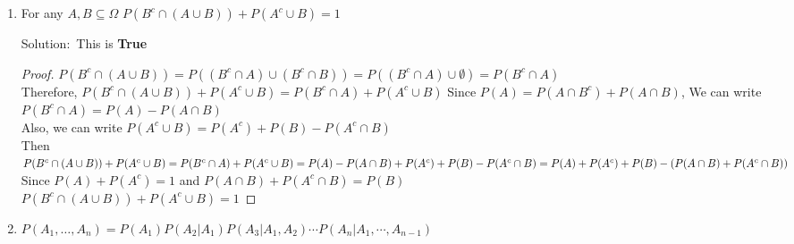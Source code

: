 \documentclass[12pt]{article}
\newcommand{\solu}{{\color{blue} Solution:}}
\begin{document}
\begin{enumerate}
\begin{enumerate}
            \solu \ This is \textbf{False}
            \begin{proof}
                From the Question, $P(B) + P(B^c) = 1$.\\
                $P(A|B) = \frac{P(A\cap B)}{P(B)}$, $P(A|B^c) = \frac{P(A\cap B^c )}{P(B^c)}$\\
                Since $P(A\cap B) + P(A\cap B^c) = P(A)$ \\
                $P(A|B) +P(A|B^c) =  \frac{P(A\cap B)}{P(B)} + \frac{P(A) - P(A\cap B)}{1 - P(B)} $\\
                Then we let $P(B) = 0.5$, $P(A) = 0.4$ and $P(A\cap B) = 0.3$\\
                $P(A|B) +P(A|B^c) = \frac{0.3}{0.5} + \frac{0.4 - 0.3}{1 - 0.5} = 0.6 + 0.2 = 0.8 \ne 1$\\
                Therefore, the given term is False.
            \end{proof}
            
            \item For any $A, B \subseteq \Omega$ $P(B^c\cap (A\cup B)) + P(A^c \cup B) = 1$
            
            \solu \ This is \textbf{True}
            \begin{proof}
                $P(B^c\cap (A\cup B)) = P((B^c \cap A)\cup (B^c \cap B)) = P((B^c \cap A)\cup \emptyset) = P(B^c \cap A)$\\
                Therefore, $P(B^c\cap (A\cup B)) + P(A^c \cup B) = P(B^c \cap A) + P(A^c \cup B)$
                Since $P(A) = P(A \cap B^c) + P(A \cap B)$, We can write $P(B^c \cap A) = P(A) - P(A \cap B)$\\
                Also, we can write $P(A^c \cup B) = P(A^c) + P(B) - P(A^c \cap B)$\\
                Then $P(B^c\cap (A\cup B)) + P(A^c \cup B) \\
                = P(B^c \cap A) + P(A^c \cup B)\\
                = P(A) - P(A \cap B) + P(A^c) + P(B) - P(A^c \cap B)\\
                = P(A)+ P(A^c) + P(B) - (P(A \cap B)+ P(A^c \cap B))$\\
                Since $P(A) + P(A^c) = 1$ and $P(A \cap B) + P(A^c \cap B) = P(B)$\\
                $P(B^c\cap (A\cup B)) + P(A^c \cup B) = 1$
            \end{proof}

            \item $P(A_1, \dots, A_n) = P(A_1)P(A_2|A_1)P(A_3|A_1, A_2) \cdots P(A_n|A_1,\cdots,A_{n-1})$
            

\end{enumerate}
\end{enumerate}
\end{document}

